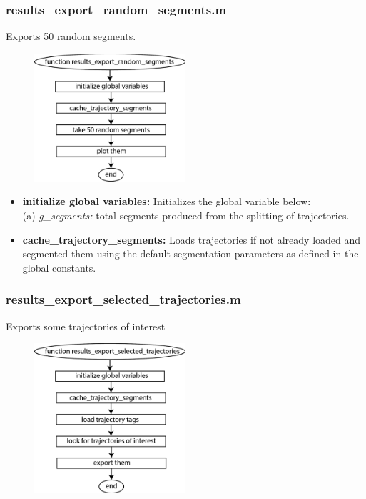 \documentclass[12pt,titlepage]{article}
\begin{document}
\begin{doublespace}
\subsubsection{results\_export\_random\_segments.m}
Exports 50 random segments.

\begin{figure}[H]
	\begin{center}
		\includegraphics[width=0.5\textwidth]{results_export_random_segments.jpg}
		\label{rand_seg}
	\end{center}
\end{figure}

\begin{itemize}
	\item\textbf{initialize global variables:} Initializes the global variable below:\\
	(a) \textit{g\_segments:} total segments produced from the splitting of trajectories.
	\item\textbf{cache\_trajectory\_segments:} Loads trajectories if not already loaded and segmented them using the default segmentation parameters as defined in the global constants.
\end{itemize}	

\subsubsection{results\_export\_selected\_trajectories.m}
Exports some trajectories of interest

\begin{figure}[H]
	\begin{center}
		\includegraphics[width=0.5\textwidth]{results_export_selected_trajectories.jpg}
		\label{selected_traj}
	\end{center}
\end{figure}


\end{doublespace}
\end{document}
